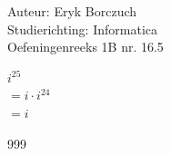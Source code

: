 \documentclass[a4paper]{article}
\begin{document}
  
\noindent \large Auteur: Eryk Borczuch \\
\noindent \large Studierichting: Informatica\\
\noindent \large Oefeningenreeks 1B nr. 16.5\\

\medskip

\normalsize

$i^{25}$\\

$= i \cdot i^{24}$\\

$= i$\\

\begin{thebibliography}{999}
\end{thebibliography}
\end{document}
